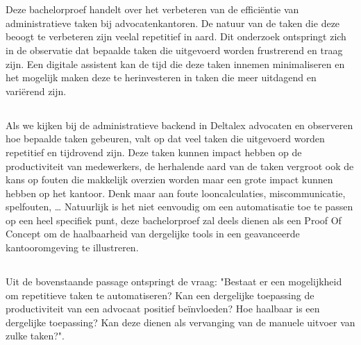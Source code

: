 
\chapter{}%
Deze bachelorproef handelt over het verbeteren van de efficiëntie van administratieve taken bij advocatenkantoren.
De natuur van de taken die deze beoogt te verbeteren zijn veelal repetitief in aard.
Dit onderzoek ontspringt zich in de observatie dat bepaalde taken die uitgevoerd worden frustrerend en traag zijn.
Een digitale assistent kan de tijd die deze taken innemen minimaliseren en het mogelijk maken deze te herinvesteren in taken die meer uitdagend en variërend zijn.

\section{}%
\label{sec:probleemstelling}

Als we kijken bij de administratieve backend in Deltalex advocaten en observeren hoe bepaalde taken gebeuren, valt op dat veel taken die uitgevoerd worden repetitief en tijdrovend zijn.
Deze taken kunnen impact hebben op de productiviteit van medewerkers, de herhalende aard van de taken vergroot
ook de kans op fouten die makkelijk overzien worden maar een grote impact kunnen hebben op het kantoor.
Denk maar aan foute looncalculaties, miscommunicatie, spelfouten, \dots
Natuurlijk is het niet eenvoudig om een automatisatie toe te passen op een heel specifiek punt, deze bachelorproef zal deels dienen als een Proof Of Concept om de haalbaarheid van
dergelijke tools in een geavanceerde kantooromgeving te illustreren.

\section{}%
\label{sec:onderzoeksvraag}

Uit de bovenstaande passage ontspringt de vraag:
"Bestaat er een mogelijkheid om repetitieve taken te automatiseren?
Kan een dergelijke toepassing de productiviteit van een advocaat positief beïnvloeden?
Hoe haalbaar is een dergelijke toepassing?
Kan deze dienen als vervanging van de manuele uitvoer van zulke taken?".

